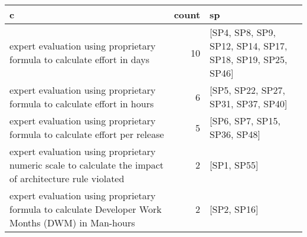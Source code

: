 \begin{tabular}{lrl}
\toprule
                                                                                                       c &  count &                                                         sp \\
\midrule
                                 expert evaluation using proprietary formula to calculate effort in days &     10 &  [SP4, SP8, SP9, SP12, SP14, SP17, SP18, SP19, SP25, SP46] \\
                                expert evaluation using proprietary formula to calculate effort in hours &      6 &                        [SP5, SP22, SP27, SP31, SP37, SP40] \\
                             expert evaluation using proprietary formula to calculate effort per release &      5 &                               [SP6, SP7, SP15, SP36, SP48] \\
 expert evaluation using proprietary numeric scale to calculate the impact of architecture rule violated &      2 &                                                [SP1, SP55] \\
       expert evaluation using proprietary formula to calculate Developer Work Months (DWM) in Man-hours &      2 &                                                [SP2, SP16] \\
\bottomrule
\end{tabular}
